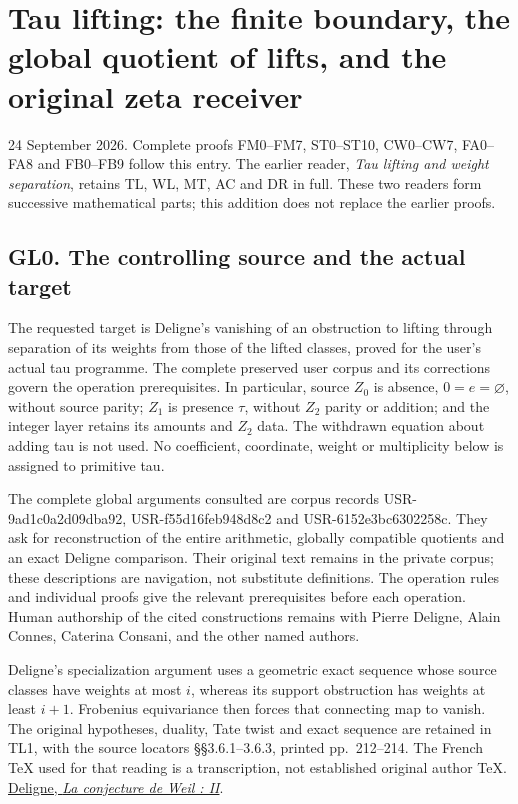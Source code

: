 \section{Tau lifting: the finite boundary, the global quotient of lifts,
and the original zeta
receiver}\label{tau-lifting-the-finite-boundary-the-global-quotient-of-lifts-and-the-original-zeta-receiver}

24 September 2026. Complete proofs FM0--FM7, ST0--ST10, CW0--CW7,
FA0--FA8 and FB0--FB9 follow this entry. The earlier reader, \emph{Tau
lifting and weight separation}, retains TL, WL, MT, AC and DR in full.
These two readers form successive mathematical parts; this addition does
not replace the earlier proofs.

\subsection{GL0. The controlling source and the actual
target}\label{gl0.-the-controlling-source-and-the-actual-target}

The requested target is Deligne's vanishing of an obstruction to lifting
through separation of its weights from those of the lifted classes,
proved for the user's actual tau programme. The complete preserved user
corpus and its corrections govern the operation prerequisites. In
particular, source \(Z_0\) is absence, \(0=e=\varnothing\), without
source parity; \(Z_1\) is presence \(\tau\), without \(Z_2\) parity or
addition; and the integer layer retains its amounts and \(Z_2\) data.
The withdrawn equation about adding tau is not used. No coefficient,
coordinate, weight or multiplicity below is assigned to primitive tau.

The complete global arguments consulted are corpus records
USR-9ad1c0a2d09dba92, USR-f55d16feb948d8c2 and USR-6152e3bc6302258c.
They ask for reconstruction of the entire arithmetic, globally
compatible quotients and an exact Deligne comparison. Their original
text remains in the private corpus; these descriptions are navigation,
not substitute definitions. The operation rules and individual proofs
give the relevant prerequisites before each operation. Human authorship
of the cited constructions remains with Pierre Deligne, Alain Connes,
Caterina Consani, and the other named authors.

Deligne's specialization argument uses a geometric exact sequence whose
source classes have weights at most \(i\), whereas its support
obstruction has weights at least \(i+1\). Frobenius equivariance then
forces that connecting map to vanish. The original hypotheses, duality,
Tate twist and exact sequence are retained in TL1, with the source
locators §§3.6.1--3.6.3, printed pp.~212--214. The French TeX used for
that reading is a transcription, not established original author TeX.
\href{https://www.numdam.org/item/PMIHES_1980__52__137_0/}{Deligne,
\emph{La conjecture de Weil : II}}.

